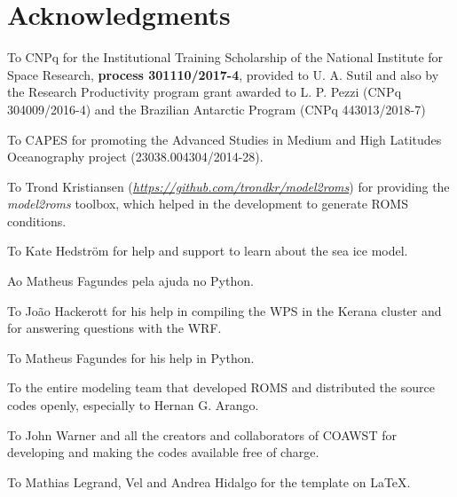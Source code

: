 \chapter*{Acknowledgments}

\bigskip


\noindent To CNPq for the Institutional Training Scholarship of the National Institute for Space Research, \textbf{process 301110/2017-4},
provided to U. A. Sutil and also by the Research Productivity program grant awarded to L. P. Pezzi (CNPq 304009/2016-4) and the 
Brazilian Antarctic Program (CNPq 443013/2018-7)
\bigskip

\noindent To CAPES for promoting the Advanced Studies in Medium and High Latitudes Oceanography project (23038.004304/2014-28). 
\bigskip

\noindent To Trond Kristiansen (\textcolor{bleu_cite}{\textit{\href{https://github.com/trondkr/model2roms}{https://github.com/trondkr/model2roms}}}) for providing the
 \textit{model2roms} toolbox, which helped in the development to generate ROMS conditions.
\bigskip

\noindent To Kate Hedström for help and support to learn about the sea ice model.
\bigskip

\noindent Ao Matheus Fagundes pela ajuda no Python. 
\bigskip

\noindent To João Hackerott for his help in compiling the WPS in the Kerana cluster and for answering questions with the WRF.
\bigskip

\noindent To Matheus Fagundes for his help in Python.
\bigskip

\noindent To the entire modeling team that developed ROMS and distributed the source codes openly,
especially to Hernan G. Arango.
\bigskip

\noindent To John Warner and all the creators and collaborators of COAWST for developing and making the codes available free of charge.
\bigskip

\noindent To Mathias Legrand, Vel and Andrea Hidalgo for the template on \LaTeX.
\bigskip
